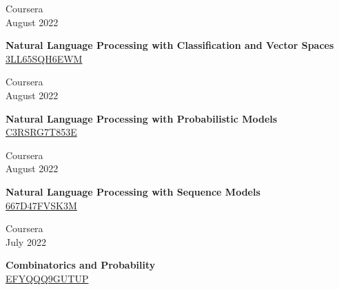 \documentclass[10pt,a4paper]{article}
\newcommand{\lmpratio}{0.15}
\newcommand{\rmpratio}{0.74}
\newcommand{\horizontalSpace}{0.05\textwidth}
\newcommand{\sectionMain}[1]{\textbf{#1}}
\begin{document}
	\begin{minipage}[t]{\lmpratio\textwidth}
		Coursera\\August 2022
	\end{minipage}
	\hspace{\horizontalSpace}
	\begin{minipage}[t]{\rmpratio\textwidth}
		\sectionMain{Natural Language Processing with Classification and Vector Spaces}\\
		\href{https://www.coursera.org/account/accomplishments/certificate/3LL65SQH6EWM}{3LL65SQH6EWM}
	\end{minipage}
	\vspace{1cm}

	\begin{minipage}[t]{\lmpratio\textwidth}
		Coursera\\August 2022
	\end{minipage}
	\hspace{\horizontalSpace}
	\begin{minipage}[t]{\rmpratio\textwidth}
		\sectionMain{Natural Language Processing with Probabilistic Models}\\
		\href{https://www.coursera.org/account/accomplishments/certificate/C3RSRG7T853E}{C3RSRG7T853E}
	\end{minipage}
	\vspace{1cm}
	

	\begin{minipage}[t]{\lmpratio\textwidth}
		Coursera\\August 2022
	\end{minipage}
	\hspace{\horizontalSpace}
	\begin{minipage}[t]{\rmpratio\textwidth}
		\sectionMain{Natural Language Processing with Sequence Models}\\
		\href{https://www.coursera.org/account/accomplishments/certificate/667D47FVSK3M}{667D47FVSK3M}
	\end{minipage}
	\vspace{1cm}


	\begin{minipage}[t]{\lmpratio\textwidth}
		Coursera\\July 2022
	\end{minipage}
	\hspace{\horizontalSpace}
	\begin{minipage}[t]{\rmpratio\textwidth}
		\sectionMain{Combinatorics and Probability}\\
		\href{https://www.coursera.org/account/accomplishments/certificate/EFYQQQ9GUTUP}{EFYQQQ9GUTUP}
	\end{minipage}
	\vspace{1cm}
\end{document}
